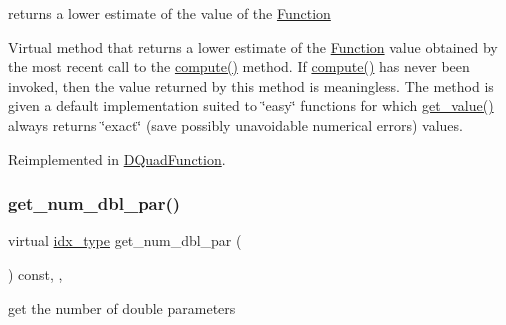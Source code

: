 returns a lower estimate of the value of the \mbox{\hyperlink{class_s_m_spp__di__unipi__it_1_1_function}{Function}} 

Virtual method that returns a lower estimate of the \mbox{\hyperlink{class_s_m_spp__di__unipi__it_1_1_function}{Function}} value obtained by the most recent call to the \mbox{\hyperlink{class_s_m_spp__di__unipi__it_1_1_function_a504d4e3e174c7a518cc66156a8a45ce5}{compute()}} method. If \mbox{\hyperlink{class_s_m_spp__di__unipi__it_1_1_function_a504d4e3e174c7a518cc66156a8a45ce5}{compute()}} has never been invoked, then the value returned by this method is meaningless. The method is given a default implementation suited to \char`\"{}easy\char`\"{} functions for which \mbox{\hyperlink{class_s_m_spp__di__unipi__it_1_1_function_a040b4850ae0a23a1c9ff79b497b6eaaf}{get\+\_\+value()}} always returns \char`\"{}exact\char`\"{} (save possibly unavoidable numerical errors) values. 

Reimplemented in \mbox{\hyperlink{class_s_m_spp__di__unipi__it_1_1_d_quad_function_a33520123d0919481e4f7cc5bc6da28a9}{D\+Quad\+Function}}.

\mbox{\label{class_s_m_spp__di__unipi__it_1_1_function_a842fd454acaded84baf6b77e0d61a950}} 
\subsubsection{\texorpdfstring{get\+\_\+num\+\_\+dbl\+\_\+par()}{get\_num\_dbl\_par()}}
{\footnotesize\ttfamily virtual \mbox{\hyperlink{class_s_m_spp__di__unipi__it_1_1_thin_compute_interface_aa3d710629ad8c434286726ad810c3b47}{idx\+\_\+type}} get\+\_\+num\+\_\+dbl\+\_\+par (\begin{DoxyParamCaption}\item[{void}]{ }\end{DoxyParamCaption}) const\hspace{0.3cm}{\ttfamily [inline]}, {\ttfamily [override]}, {\ttfamily [virtual]}}



get the number of double parameters 

